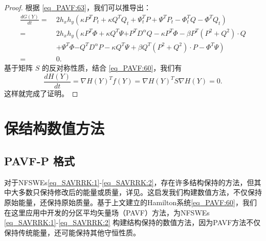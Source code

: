 \begin{proof}
	根据 \eqref{eq_PAVF:63}，我们可以推导出：
	\begin{align}\label{eq_PAVF:64}
		\frac{d G(Y)}{d t}=&~2 h_{x} h_{y}\left(\kappa P^{T}P_t+\kappa Q^{T}Q_t+\Psi^{T}_t P+\Psi^{T}P_{t}-\varPhi^{T}_t Q-\varPhi^{T}Q_{t}\right)\nonumber\\
		=&~2 h_{x} h_{y}\left(\kappa P^{T}\varPhi+\kappa Q^{T}\Psi {+ P^{T}D^{\alpha}Q}-\kappa P^{T}\varPhi-\beta P^{T}\left( P^{2}+Q^{2}\right)\cdot Q\right.\nonumber\\
		&~\left.+\Psi^{T}\varPhi{-Q^{T}D^{\alpha}P}-\kappa Q^{T}\Psi+\beta Q^{T}\left( P^{2}+Q^{2}\right)\cdot P-\varPhi^{T}\Psi\right)\nonumber\\
		=&~0.
		\end{align}
		基于矩阵 $S$ 的反对称性质，结合 \eqref{eq_PAVF:60}，我们有
		\begin{equation}\label{eq_PAVF:65}
		\frac{d H(Y)}{d t}=\nabla H(Y)^{T} f(Y)=\nabla H(Y)^{T} S \nabla H(Y)=0 .
		\end{equation}
		这样就完成了证明。
		\end{proof}


\section{保结构数值方法}\label{Section_PAVF: 3}
\subsection{PAVF-P 格式}

对于NFSWEs\eqref{eq_SAVRRK:1}-\eqref{eq_SAVRRK:2}，存在许多结构保持的方法，但其中大多数只保持修改后的能量或质量，详见\cite{liFastEnergyConserving2018,huEfficientEnergyPreserving2022}。这启发我们构建数值方法，不仅保持原始能量，还保持原始质量。基于上文建立的Hamilton系统\eqref{eq_PAVF:60}，我们在这里应用\cite{caiPartitionedAveragedVector2018}中开发的分区平均矢量场（PAVF）方法，为NFSWEs \eqref{eq_SAVRRK:1}-\eqref{eq_SAVRRK:2} 构建结构保持的数值方法，因为PAVF方法不仅保持传统能量，还可能保持其他守恒性质。

